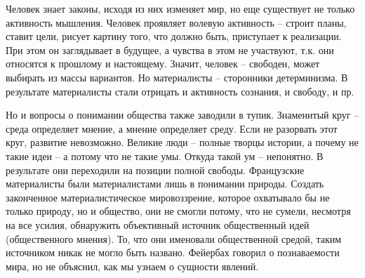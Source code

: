 Человек знает законы, исходя из них изменяет мир, но еще существует не только активность мышления. Человек проявляет волевую активность – строит планы, ставит цели, рисует картину того, что должно быть, приступает к реализации. При этом он заглядывает в будущее, а чувства в этом не участвуют, т.к. они относятся к прошлому и настоящему. Значит, человек – свободен, может выбирать из массы вариантов. Но материалисты – сторонники детерминизма. В результате материалисты стали отрицать и активность сознания, и свободу, и пр.

Но и вопросы о понимании общества также заводили в тупик. Знаменитый круг – среда определяет мнение, а мнение определяет среду. Если не разорвать этот круг, развитие невозможно. Великие люди – полные творцы истории, а почему не такие идеи – а потому что не такие умы. Откуда такой ум – непонятно. В результате они переходили на позиции полной свободы. Французские материалисты были материалистами лишь в понимании природы. Создать законченное материалистическое мировоззрение, которое охватывало бы не только природу, но и общество, они не смогли потому, что не сумели, несмотря на все усилия, обнаружить объективный источник общественный идей (общественного мнения). То, что они именовали общественной средой, таким источником никак не могло быть названо. Фейербах говорил о познаваемости мира, но не объяснил, как мы узнаем о сущности явлений.
